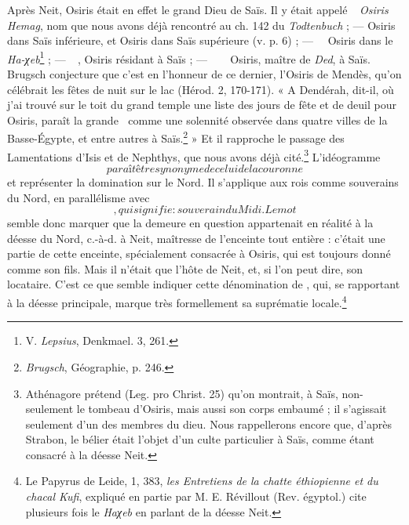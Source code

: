 \documentclass[a4paper, 11pt, oneside]{article}
\newcommand*\hieroglyhicsAAAW{\raisebox{0.5ex}{}}
\newcommand*\hieroglyhicsAAAX{}
\newcommand*\hieroglyhicsAABC{\raisebox{0.5ex}{}}
\newcommand*\hieroglyhicsAADV{\raisebox{0.5ex}{}}
\newcommand*\hieroglyhicsAAEZ{}
\newcommand*\hieroglyhicsAAFW{}
\newcommand*\hieroglyhicsAAHK{}
\newcommand*\hieroglyhicsAAHO{}
\newcommand*\hieroglyhicsAAIL{}
\newcommand*\hieroglyhicsAAIQ{}
\newcommand*\hieroglyhicsAAJC{}
\newcommand*\hieroglyhicsAAJE{}
\newcommand*\hieroglyhicsAAJF{}
\newcommand*\hieroglyhicsAAJG{}
\newcommand*\hieroglyhicsAAJH{\raisebox{0.5ex}{}}
\newcommand*\hieroglyhicsAAJI{}
\newcommand*\hieroglyhicsAAJJ{}
\newcommand*\hieroglyhicsAAJK{}
\newcommand*\hieroglyhicsAAJL{}
\begin{document}
Après Neit, Osiris était en effet le grand Dieu de Saïs. Il y était appelé $\hieroglyhicsAAJE\:\hieroglyhicsAAEZ\:\hieroglyhicsAAJF$ \emph{Osiris Hemag}, nom que nous avons déjà rencontré au ch. 142 du \emph{Todtenbuch} ; --- Osiris dans Saïs inférieure, et Osiris dans Saïs supérieure (v. p. 6) ; --- $\hieroglyhicsAAJE\:\hieroglyhicsAAHO\allowbreak\:\hieroglyhicsAAHK\:\hieroglyhicsAAJC$ Osiris dans le \emph{Ha-χeb}\footnote{V. \emph{Lepsius}, Denkmael. 3, 261.} ; --- $\hieroglyhicsAAJG\:\hieroglyhicsAAIQ\allowbreak\:\hieroglyhicsAAJH\:\hieroglyhicsAAAW$, Osiris résidant à Saïs ; --- $\hieroglyhicsAAJG\:\hieroglyhicsAABC\:\hieroglyhicsAAJI\allowbreak\:\hieroglyhicsAAJJ\:\hieroglyhicsAADV\allowbreak\:\hieroglyhicsAAJH\:\hieroglyhicsAAAW$ Osiris, maître de \emph{Ded}, à Saïs. Brugsch conjecture que c'est en l'honneur de ce dernier, l'Osiris de Mendès, qu'on célébrait les fêtes de nuit sur le lac (Hérod. 2, 170-171). « A Dendérah, dit-il, où j'ai trouvé sur le toit du grand temple une liste des jours de fête et de deuil pour Osiris, paraît la grande $\hieroglyhicsAAJK\:\hieroglyhicsAAJL$ comme une solennité observée dans quatre villes de la Basse-Égypte, et entre autres à Saïs.\footnote{\emph{Brugsch}, Géographie, p. 246.} » Et il rapproche le passage des Lamentations d'Isis et de Nephthys, que nous avons déjà cité.\footnote{Athénagore prétend (Leg. pro Christ. 25) qu'on montrait, à Saïs, non-seulement le tombeau d'Osiris, mais aussi son corps embaumé ; il s'agissait seulement d'un des membres du dieu.  Nous rappellerons encore que, d'après Strabon, le bélier était l'objet d'un culte particulier à Saïs, comme étant consacré à la déesse Neit.} L'idéogramme $\hieroglyhicsAAJC$ paraît être synonyme de celui de la couronne $\hieroglyhicsAAIL$ et représenter la domination sur le Nord. Il s'applique aux rois comme souverains du Nord, en parallélisme avec $\hieroglyhicsAAAX$, qui signifie : souverain du Midi. Le mot $\hieroglyhicsAAFW$ semble donc marquer que la demeure en question appartenait en réalité à la déesse du Nord, c.-à-d. à Neit, maîtresse de l'enceinte tout entière : c'était une partie de cette enceinte, spécialement consacrée à Osiris, qui est toujours donné comme son fils. Mais il n'était que l'hôte de Neit, et, si l'on peut dire, son locataire. C'est ce que semble indiquer cette dénomination de $\hieroglyhicsAAFW$, qui, se rapportant à la déesse principale, marque très formellement sa suprématie locale.\footnote{Le Papyrus de Leide, 1, 383, \emph{les Entretiens de la chatte éthiopienne et du chacal Kufi}, expliqué en partie par M. E. Révillout (Rev. égyptol.) cite plusieurs fois le \emph{Haχeb} en parlant de la déesse Neit.}
\end{document}

